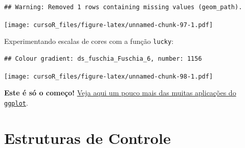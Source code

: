 \documentclass[]{book}
\newenvironment{Shaded}{\begin{snugshade}}{\end{snugshade}}
\newcommand{\KeywordTok}[1]{\textcolor[rgb]{0.13,0.29,0.53}{\textbf{#1}}}
\newcommand{\DataTypeTok}[1]{\textcolor[rgb]{0.13,0.29,0.53}{#1}}
\newcommand{\DecValTok}[1]{\textcolor[rgb]{0.00,0.00,0.81}{#1}}
\newcommand{\StringTok}[1]{\textcolor[rgb]{0.31,0.60,0.02}{#1}}
\newcommand{\CommentTok}[1]{\textcolor[rgb]{0.56,0.35,0.01}{\textit{#1}}}
\newcommand{\OperatorTok}[1]{\textcolor[rgb]{0.81,0.36,0.00}{\textbf{#1}}}
\newcommand{\NormalTok}[1]{#1}
\theoremstyle{definition}
\theoremstyle{definition}
\theoremstyle{definition}
\theoremstyle{remark}
\begin{document}
\begin{verbatim}
## Warning: Removed 1 rows containing missing values (geom_path).
\end{verbatim}

\texttt{[image: cursoR\_files/figure-latex/unnamed-chunk-97-1.pdf]}

Experimentando escalas de cores com a função \texttt{lucky}:

\begin{Shaded}
\end{Shaded}

\begin{verbatim}
## Colour gradient: ds_fuschia_Fuschia_6, number: 1156
\end{verbatim}

\texttt{[image: cursoR\_files/figure-latex/unnamed-chunk-98-1.pdf]}

\textbf{Este é só o começo!}
\href{http://r-statistics.co/Top50-Ggplot2-Visualizations-MasterList-R-Code.html}{Veja
aqui um pouco mais das muitas aplicações do \texttt{ggplot}}.

\chapter{Estruturas de Controle}\label{loop}
\end{document}
